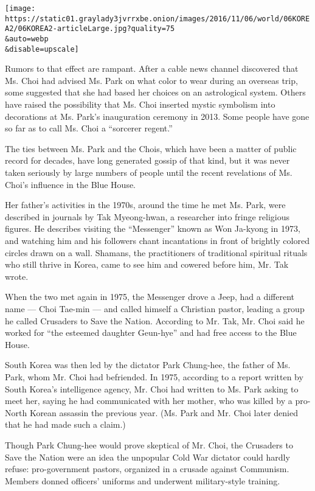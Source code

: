 \texttt{[image: https://static01.graylady3jvrrxbe.onion/images/2016/11/06/world/06KOREA2/06KOREA2-articleLarge.jpg?quality=75\\\&auto=webp\\\&disable=upscale]}

Rumors to that effect are rampant. After a cable news channel discovered
that Ms. Choi had advised Ms. Park on what color to wear during an
overseas trip, some suggested that she had based her choices on an
astrological system. Others have raised the possibility that Ms. Choi
inserted mystic symbolism into decorations at Ms. Park's inauguration
ceremony in 2013. Some people have gone so far as to call Ms. Choi a
``sorcerer regent.''

The ties between Ms. Park and the Chois, which have been a matter of
public record for decades, have long generated gossip of that kind, but
it was never taken seriously by large numbers of people until the recent
revelations of Ms. Choi's influence in the Blue House.

Her father's activities in the 1970s, around the time he met Ms. Park,
were described in journals by Tak Myeong-hwan, a researcher into fringe
religious figures. He describes visiting the ``Messenger'' known as Won
Ja-kyong in 1973, and watching him and his followers chant incantations
in front of brightly colored circles drawn on a wall. Shamans, the
practitioners of traditional spiritual rituals who still thrive in
Korea, came to see him and cowered before him, Mr. Tak wrote.

When the two met again in 1975, the Messenger drove a Jeep, had a
different name --- Choi Tae-min --- and called himself a Christian
pastor, leading a group he called Crusaders to Save the Nation.
According to Mr. Tak, Mr. Choi said he worked for ``the esteemed
daughter Geun-hye'' and had free access to the Blue House.

South Korea was then led by the dictator Park Chung-hee, the father of
Ms. Park, whom Mr. Choi had befriended. In 1975, according to a report
written by South Korea's intelligence agency, Mr. Choi had written to
Ms. Park asking to meet her, saying he had communicated with her mother,
who was killed by a pro-North Korean assassin the previous year. (Ms.
Park and Mr. Choi later denied that he had made such a claim.)

Though Park Chung-hee would prove skeptical of Mr. Choi, the Crusaders
to Save the Nation were an idea the unpopular Cold War dictator could
hardly refuse: pro-government pastors, organized in a crusade against
Communism. Members donned officers' uniforms and underwent
military-style training.

